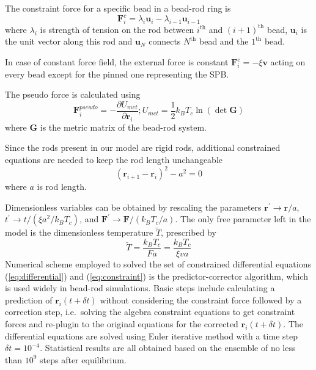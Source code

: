 \documentclass{article}
\begin{document}
The constraint force for a specific bead in a bead-rod ring is
\begin{equation}
	\mathbf{F}_i^c = \lambda_i \mathbf{u}_i - \lambda_{i-1} \mathbf{u}_{i-1}
\end{equation}
where $\lambda_i$ is strength of tension on the rod between $i^{\text{th}}$ and $(i+1)^{\text{th}}$ bead, $\mathbf{u}_i$ is the unit vector along this rod and $\mathbf{u}_{N}$ connects $N^{\text{th}}$ bead and the $1^{\text{th}}$ bead. 

In case of constant force field, the external force is constant $\mathbf{F}_i^e = -\xi \mathbf{v}$ acting on every bead except for the pinned one representing the SPB. 

The pseudo force is calculated using
\begin{equation}
	\mathbf{F}_i^{pseudo} = -\frac{\partial U_{met}}{\partial\mathbf{r}_i};
	U_{met} = \frac{1}{2}k_B T_c \ln(\det \mathbf{G})
\end{equation}
where $\mathbf{G}$ is the metric matrix of the bead-rod system\cite{Pasquali2002}.

Since the rods present in our model are rigid rods, additional constrained equations are needed to keep the rod length unchangeable
\begin{equation}
	\label{eq:constraint}
	(\mathbf{r}_{i+1} - \mathbf{r}_{i})^2 - a^2 = 0
\end{equation}
where $a$ is rod length. 

Dimensionless variables can be obtained by rescaling the parameters $\mathbf{r}^{\prime}\to \mathbf{r}/a$, $t^{\prime}\to t/(\xi a^2/k_BT_c)$, and $\mathbf{F}^{\prime}\to\mathbf{F}/(k_BT_c/a)$. The only free parameter left in the model is the dimensionless temperature $\tilde{T}$, prescribed by 
\begin{equation}
	\label{eq:Teff}
	\tilde{T} = \frac{k_BT_c}{Fa} = \frac{k_B T_c}{\xi v a}
\end{equation}
Numerical scheme employed to solved the set of constrained differential equations (\ref{eq:differential}) and (\ref{eq:constraint}) is the predictor-corrector algorithm, which is used widely in bead-rod simulations\cite{Cruz2012,Somasi2002,Liu1989}.
Basic steps include calculating a prediction of $\mathbf{r}_i(t+\delta t)$ without considering the constraint force followed by a correction step, i.e.\ solving the algebra constraint equations to get constraint forces and re-plugin to the original equations for the corrected $\mathbf{r}_i(t+\delta t)$.
The differential equations are solved using Euler iterative method with a time
step $\delta t = 10^{-4}$.  Statistical results are all obtained based on the
ensemble of no less than $10^{9}$ steps after equilibrium.  
\end{document}
